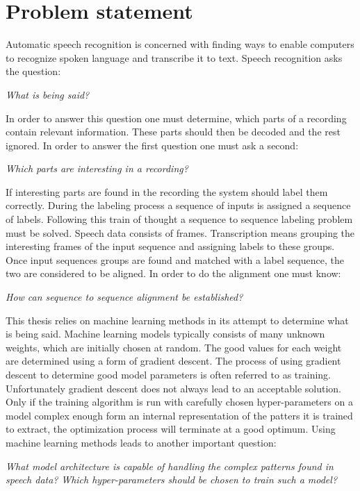 \chapter{Problem statement}
\label{cha:problemStatement}
Automatic speech recognition is concerned with finding ways to enable computers to recognize spoken language and transcribe it to text. Speech recognition asks the question: 

\noindent \textit{What is being said?}

In order to answer this question one must determine, which parts of a recording contain relevant information. These parts should then be decoded and the rest ignored. In order to answer the first question one must ask a second: 

\noindent \textit{Which parts are interesting in a recording?}

If interesting parts are found in the recording the system should label them correctly. During the labeling process a sequence of inputs is assigned a sequence of labels. Following this train of thought a sequence to sequence labeling problem must be solved. Speech data consists of frames. Transcription means grouping the interesting frames of the input sequence and assigning labels to these groups. Once input sequences groups are found and matched with a label sequence, the two are considered to be aligned. In order to do the alignment one must know: 

\noindent \textit{How can sequence to sequence alignment be established?} 

This thesis relies on machine learning methods in its attempt to determine what is being said. Machine learning models typically consists of many unknown weights, which are initially chosen at random. The good values for each weight are determined using a form of gradient descent. The process of using gradient descent to determine good model parameters is often referred to as training. Unfortunately gradient descent does not always lead to an acceptable solution. Only if the training algorithm is run with carefully chosen hyper-parameters on a model complex enough form an internal representation of the patters it is trained to extract, the optimization process will terminate at a good optimum. Using machine learning methods leads to another important question: 

\noindent \textit{What model architecture is capable of handling the complex patterns found in speech data?}
\textit{Which hyper-parameters should be chosen to train such a model?}


